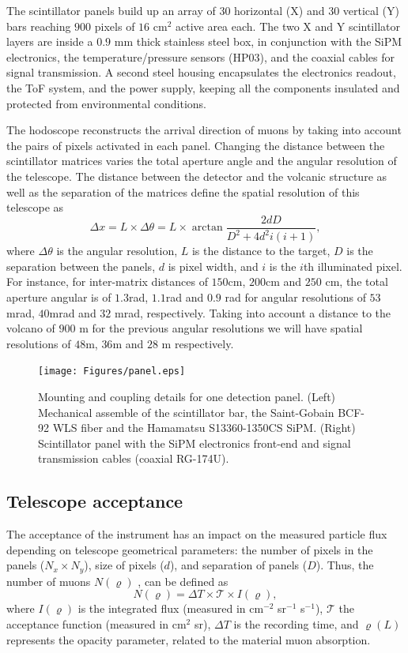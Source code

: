 \documentclass[letterpaper,11pt]{article}
\begin{document}
The scintillator panels build up an array of $30$ horizontal (X) and $30$ vertical (Y) bars reaching $900$ pixels of $16$ cm$^2$ active area each. The two X and Y scintillator layers are inside a $0.9$ mm thick stainless steel box, in conjunction with the SiPM electronics, the temperature/pressure sensors (HP03), and the coaxial cables for signal transmission. A second steel housing encapsulates the electronics readout, the ToF system, and the power supply, keeping all the components insulated and protected from environmental conditions. 

The hodoscope reconstructs the arrival direction of muons by taking into account the pairs of pixels activated in each panel. Changing the distance between the scintillator matrices varies the total aperture angle and the angular resolution of the telescope. The distance between the detector and the volcanic structure as well as the separation of the matrices define the spatial resolution of this telescope as
\begin{equation}
\Delta x=L\times\Delta\theta=L\times \arctan{\frac{2dD}{D^2+4d^2i(i+1)}},
\end{equation}
where $\Delta\theta$ is the angular resolution, $L$ is the distance to the target, $D$ is the separation between the panels, $d$ is pixel width, and $i$ is the $i$th illuminated pixel. For instance, for inter-matrix distances of $150$cm, $200$cm and $250$ cm, the total aperture angular is of $1.3$rad, $1.1$rad and $0.9$ rad for angular resolutions of $53$mrad, $40$mrad and $32$ mrad, respectively. Taking into account a distance to the volcano of $900$ m for the previous angular resolutions we will have spatial resolutions of $48$m, $36$m and $28$ m respectively.

\begin{figure}[htb]
\centering
\texttt{[image: Figures/panel.eps]}
\caption{Mounting and coupling details for one detection panel. (Left) Mechanical assemble of the scintillator bar, the Saint-Gobain BCF-92 WLS fiber and the Hamamatsu S13360-1350CS SiPM. (Right) Scintillator panel with the SiPM electronics front-end and signal transmission cables (coaxial RG-174U).}
\label{fig:frame}
\end{figure}

\subsection{Telescope acceptance}
The acceptance of the instrument has an impact on the measured particle flux depending on telescope geometrical parameters: the number of pixels in the panels ($N_x \times N_y$), size of pixels ($d$), and separation of panels ($D$). Thus, the number of muons $N(\varrho)$ \cite{LesparreEtal2010}, can be defined as
\begin{equation}
N(\varrho)=\Delta T \times \mathcal{T}\times I(\varrho), \label{Nmuons}
\end{equation}
where $I(\varrho)$ is the integrated flux (measured in cm$^{-2}$ sr$^{-1}$ s$^{-1}$), $\mathcal{T}$ the acceptance function (measured in cm$^{2}$ sr), $\Delta T$ is the recording time, and $\varrho(L)$ represents the opacity parameter, related to the material muon absorption.
\end{document}
